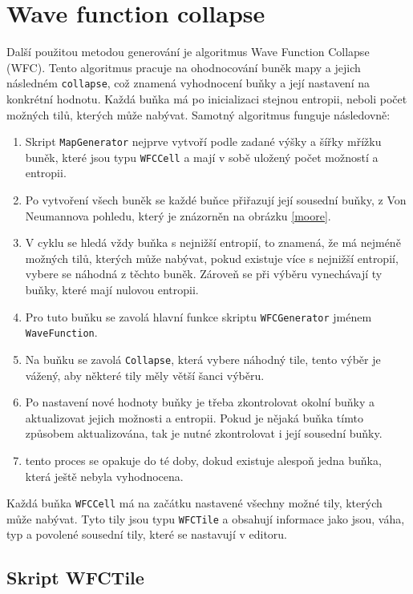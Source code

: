 \section{Wave function collapse}
\label{WFCImplement}
Další použitou metodou generování je algoritmus Wave Function Collapse (WFC). Tento algoritmus pracuje na ohodnocování buněk mapy a jejich následném \texttt{collapse}, což znamená vyhodnocení buňky a její nastavení na konkrétní hodnotu. Každá buňka má po inicializaci stejnou entropii, neboli počet možných tilů, kterých může nabývat. Samotný algoritmus funguje následovně:

\begin{enumerate}
	\item Skript \texttt{MapGenerator} nejprve vytvoří podle zadané výšky a šířky mřížku buněk, které jsou typu \texttt{WFCCell} a mají v sobě uložený počet možností a entropii.
	\item Po vytvoření všech buněk se každé buňce přiřazují její sousední buňky, z Von Neumannova pohledu, který je znázorněn na obrázku \ref{moore}.
	\item V cyklu se hledá vždy buňka s nejnižší entropií, to znamená, že má nejméně možných tilů, kterých může nabývat, pokud existuje více s nejnižší entropií, vybere se náhodná z těchto buněk. Zároveň se při výběru vynechávají ty buňky, které mají nulovou entropii.
	\item Pro tuto buňku se zavolá hlavní funkce skriptu \texttt{WFCGenerator} jménem \texttt{WaveFunction}. 
	\item Na buňku se zavolá \texttt{Collapse}, která vybere náhodný tile, tento výběr je vážený, aby některé tily měly větší šanci výběru.
	\item Po nastavení nové hodnoty buňky je třeba zkontrolovat okolní buňky a aktualizovat jejich možnosti a entropii. Pokud je nějaká buňka tímto způsobem aktualizována, tak je nutné zkontrolovat i její sousední buňky.
	\item tento proces se opakuje do té doby, dokud existuje alespoň jedna buňka, která ještě nebyla vyhodnocena.
\end{enumerate}

Každá buňka \texttt{WFCCell} má na začátku nastavené všechny možné tily, kterých může nabývat. Tyto tily jsou typu \texttt{WFCTile} a obsahují informace jako jsou, váha, typ a povolené sousední tily, které se nastavují v editoru.

\subsection{Skript WFCTile}

